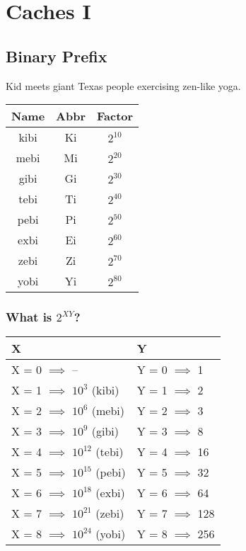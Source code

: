 \chapter{Caches I}

\section{Binary Prefix}
Kid meets giant Texas people exercising zen-like yoga.
\medskip
\newline
\begin{tabular}{ |c|c|c| } 
 \hline
 \textbf{Name} & \textbf{Abbr} & \textbf{Factor} \\ 
 \hline
 kibi & Ki & $2^{10}$ \\
 mebi & Mi & $2^{20}$ \\
 gibi & Gi & $2^{30}$ \\
 tebi & Ti & $2^{40}$ \\
 pebi & Pi & $2^{50}$ \\
 exbi & Ei & $2^{60}$ \\
 zebi & Zi & $2^{70}$ \\
 yobi & Yi & $2^{80}$ \\
 \hline
\end{tabular} 

\subsection{What is $2^{XY}$?}
\medskip
\begin{tabular}{ |l|l| } 
 \hline
 \textbf{X} & \textbf{Y} \\ 
 \hline
 X = 0 $\implies$ -- & Y = 0 $\implies$ 1 \\
 X = 1 $\implies$ $10^3$ (kibi) & Y = 1 $\implies$ 2 \\
 X = 2 $\implies$ $10^6$ (mebi) & Y = 2 $\implies$ 3 \\
 X = 3 $\implies$ $10^9$ (gibi) & Y = 3 $\implies$ 8 \\
 X = 4 $\implies$ $10^{12}$ (tebi) & Y = 4 $\implies$ 16 \\
 X = 5 $\implies$ $10^{15}$ (pebi) & Y = 5 $\implies$ 32 \\
 X = 6 $\implies$ $10^{18}$ (exbi) & Y = 6 $\implies$ 64 \\
 X = 7 $\implies$ $10^{21}$ (zebi) & Y = 7 $\implies$ 128 \\
 X = 8 $\implies$ $10^{24}$ (yobi) & Y = 8 $\implies$ 256 \\
 \hline
\end{tabular} 

